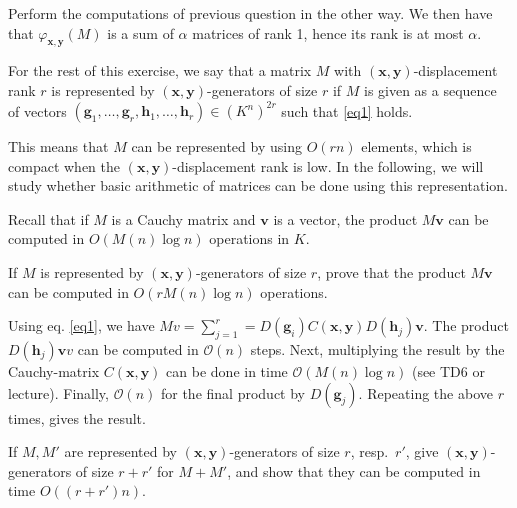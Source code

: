 \documentclass[11pt]{exam}
\theoremstyle{definition}
\newcommand{\vc}[1]{\mathbf{#1}}
\begin{document}
\begin{questions}
    	\begin{solution}
    	Perform the computations of previous question in the other way. We then have that $\varphi_{\mathbf{x,y}}(M)$ is a sum of $\alpha$ matrices of rank 1, hence its rank is at most $\alpha$.
    \end{solution}

    For the rest of this exercise, we say that a matrix $M$ with $(\vc x,\vc y)$-displacement rank $r$ is represented by $(\vc x,\vc y)$-generators of size $r$ if $M$ is given as a sequence of vectors $(\vc g_1,\dotsc, \vc g_r, \vc h_1, \dotsc, \vc h_r) \in (K^n)^{2r}$ such that \eqref{eq1} holds.

    This means that $M$ can be represented by using $O(rn)$ elements, which is compact when the $(\vc x, \vc y)$-displacement rank is low. In the following, we will study whether basic arithmetic of matrices can be done using this representation.

    Recall that if $M$ is a Cauchy matrix and $\vc v$ is a vector, the product $M\vc v$ can be computed in $O(M(n)\log n)$ operations in $K$.

    \question If $M$ is represented by $(\vc x,\vc y)$-generators of size $r$, prove that the product $M\vc v$ can be computed in $O(rM(n)\log n)$ operations.
    	\begin{solution}
    		Using eq. \eqref{eq1}, we have $M v = \sum_{j=1}^r = D(\vc g_i) C(\vc x, \vc y) D(\vc h_j) \vc v$. The product $D(\vc h_j) \vc vv$ can be computed in $\mathcal{O}(n)$ steps. Next, multiplying the result by the Cauchy-matrix $C(\vc x, \vc y)$ can be done in time $\mathcal{O}(M(n) \log n)$ (see TD6 or lecture). Finally, $\mathcal{O}(n)$ for the final product by $D(\vc g_j)$. Repeating the above $r$ times, gives the result.
    	\end{solution}

    \question If $M, M'$ are represented by $(\vc x, \vc y)$-generators of size $r$, resp.~$r'$, give $(\vc x, \vc y)$-generators of size $r+r'$ for $M+M'$, and show that they can be computed in time $O((r+r')n)$.
    

\end{questions}
\end{document}
